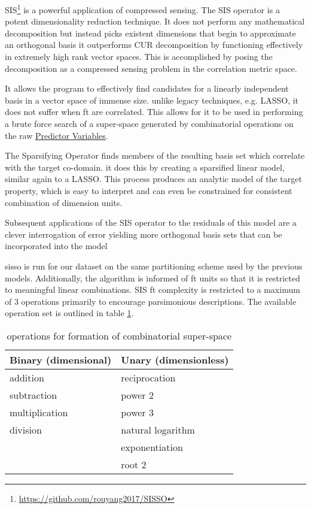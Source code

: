 \documentclass[aip, jmp, amsmath, amssymb, nofootinbib]{revtex4-2}
\begin{document}
SIS\footnote{\url{https://github.com/rouyang2017/SISSO}} is a powerful application of compressed
sensing\cite{ghiringhelli-2017-learn-physic}. The SIS operator is a
potent dimensionality reduction technique. It does not perform any
mathematical decomposition but instead picks existent dimensions that
begin to approximate an orthogonal basis it outperforms
CUR\cite{ray-2021-various-dimen,hamm-2019-cur-decom} decomposition by
functioning effectively in extremely high rank vector spaces. This is
accomplished by posing the decomposition as a compressed sensing
problem in the correlation metric space.

It allows the program to effectively find candidates for a linearly
independent basis in a vector space of immense size. unlike legacy
techniques, e.g. LASSO, it does not suffer when \gls{ft} are
correlated\cite{tibshirani-1996-regres-shrin,gauraha-2018-introd-to-lasso}. This
allows for it to be used in performing a brute force search of a
super-space generated by combinatorial operations on the raw \hyperref[sec:orgb09a235]{Predictor Variables}.

The Sparsifying Operator finds members of the resulting basis set
which correlate with the target co-domain. it does this by creating a
sparsified linear model, similar again to a LASSO. This process
produces an analytic model of the target property, which is easy to
interpret and can even be constrained for consistent combination of
dimension units.

Subsequent applications of the SIS operator to the residuals of this
model are a clever interrogation of error\cite{mayo-1998-error-growt}
yielding more orthogonal basis sets that can be incorporated into the
model

\acrshort{sisso} is run for our dataset on the same partitioning scheme used by
the previous models. Additionally, the algorithm is informed of
\gls{ft} units so that it is restricted to meaningful linear
combinations. SIS \gls{ft} complexity is restricted to a maximum of 3
operations primarily to encourage parsimonious descriptions. The
available operation set is outlined in table \ref{tbl:ops}.

\begin{table}[htbp]
\caption{\label{tbl:ops} operations for formation of combinatorial super-space}
\centering
\begin{tabular}{ll}
Binary (dimensional) & Unary (dimensionless)\\
\hline
addition & reciprocation\\
subtraction & power 2\\
multiplication & power 3\\
division & natural logarithm\\
 & exponentiation\\
 & root 2\\
\end{tabular}
\end{table}
\end{document}
